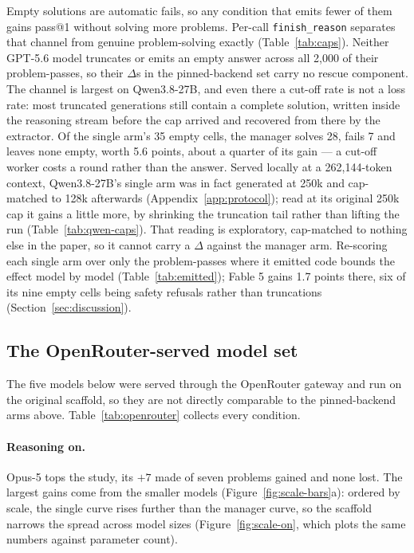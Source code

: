 \documentclass{article}
\begin{document}
Empty solutions are automatic fails, so any condition that emits fewer of them gains pass@1
without solving more problems. Per-call \texttt{finish\_reason} separates that channel from
genuine problem-solving exactly (Table~\ref{tab:caps}). Neither GPT-5.6 model truncates or
emits an empty answer across all 2{,}000 of their problem-passes, so their $\Delta$s in the
pinned-backend set carry no rescue component. The channel is largest on Qwen3.8-27B, and even
there a cut-off rate is not a loss rate: most truncated generations still contain a complete
solution, written inside the reasoning stream before the cap arrived and recovered from there
by the extractor. Of the single arm's 35 empty cells, the manager solves 28, fails 7 and
leaves none empty, worth 5.6 points, about a quarter of its gain --- a cut-off worker costs a
round rather than the answer. Served locally at a 262{,}144-token context, Qwen3.8-27B's
single arm was in fact generated at 250k and cap-matched to 128k afterwards
(Appendix~\ref{app:protocol}); read at its original 250k cap it gains a little more, by
shrinking the truncation tail rather than lifting the run (Table~\ref{tab:qwen-caps}). That
reading is exploratory, cap-matched to nothing else in the paper, so it cannot carry a
$\Delta$ against the manager arm. Re-scoring each single arm over only the problem-passes
where it emitted code bounds the effect model by model (Table~\ref{tab:emitted}); Fable 5
gains 1.7 points there, six of its nine empty cells being safety refusals rather than
truncations (Section~\ref{sec:discussion}).

\subsection{The OpenRouter-served model set}
\label{sec:openrouter}

The five models below were served through the OpenRouter gateway and run on the original
scaffold, so they are not directly comparable to the pinned-backend arms above.
Table~\ref{tab:openrouter} collects every condition.

\paragraph{Reasoning on.} Opus-5 tops the study, its $+7$ made of seven problems gained and
none lost. The largest gains come from the smaller models (Figure~\ref{fig:scale-bars}a):
ordered by scale, the single curve rises further than the manager curve, so the scaffold
narrows the spread across model sizes (Figure~\ref{fig:scale-on}, which plots the same numbers
against parameter count).
\end{document}
